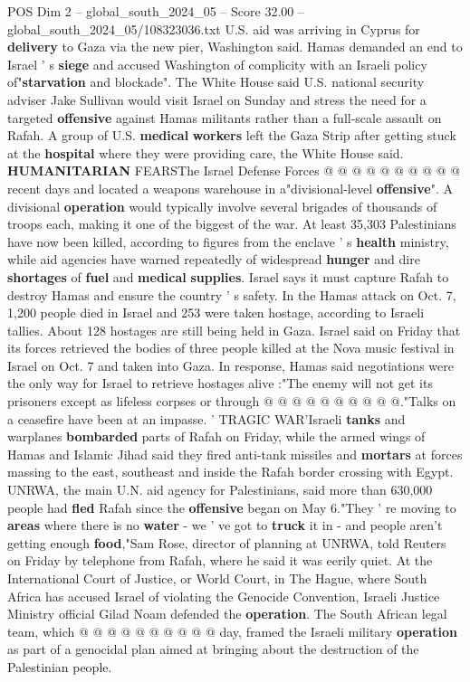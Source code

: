 \begin{textsample}{POS Dim 2 – global\_south\_2024\_05 – Score 32.00 – global\_south\_2024\_05/108323036.txt}
U.S. aid was arriving in Cyprus for \textbf{delivery} to Gaza via the new pier, Washington said.
Hamas demanded an end to Israel ' s \textbf{siege} and accused Washington of complicity with an Israeli policy of"\textbf{starvation} and blockade".
The White House said U.S. national security adviser Jake Sullivan would visit Israel on Sunday and stress the need for a targeted \textbf{offensive} against Hamas militants rather than a full-scale assault on Rafah.
A group of U.S. \textbf{medical} \textbf{workers} left the Gaza Strip after getting stuck at the \textbf{hospital} where they were providing care, the White House said. \textbf{HUMANITARIAN} FEARSThe Israel Defense Forces @ @ @ @ @ @ @ @ @ @ recent days and located a weapons warehouse in a"divisional-level \textbf{offensive}".
A divisional \textbf{operation} would typically involve several brigades of thousands of troops each, making it one of the biggest of the war.
At least 35,303 Palestinians have now been killed, according to figures from the enclave ' s \textbf{health} ministry, while aid agencies have warned repeatedly of widespread \textbf{hunger} and dire \textbf{shortages} of \textbf{fuel} and \textbf{medical} \textbf{supplies}.
Israel says it must capture Rafah to destroy Hamas and ensure the country ' s safety.
In the Hamas attack on Oct. 7, 1,200 people died in Israel and 253 were taken hostage, according to Israeli tallies.
About 128 hostages are still being held in Gaza.
Israel said on Friday that its forces retrieved the bodies of three people killed at the Nova music festival in Israel on Oct. 7 and taken into Gaza.
In response, Hamas said negotiations were the only way for Israel to retrieve hostages alive :"The enemy will not get its prisoners except as lifeless corpses or through @ @ @ @ @ @ @ @ @ @."Talks on a ceasefire have been at an impasse. ' TRAGIC WAR'Israeli \textbf{tanks} and warplanes \textbf{bombarded} parts of Rafah on Friday, while the armed wings of Hamas and Islamic Jihad said they fired anti-tank missiles and \textbf{mortars} at forces massing to the east, southeast and inside the Rafah border crossing with Egypt.
UNRWA, the main U.N. aid agency for Palestinians, said more than 630,000 people had \textbf{fled} Rafah since the \textbf{offensive} began on May 6."They ' re moving to \textbf{areas} where there is no \textbf{water} - we ' ve got to \textbf{truck} it in - and people aren't getting enough \textbf{food},"Sam Rose, director of planning at UNRWA, told Reuters on Friday by telephone from Rafah, where he said it was eerily quiet.
At the International Court of Justice, or World Court, in The Hague, where South Africa has accused Israel of violating the Genocide Convention, Israeli Justice Ministry official Gilad Noam defended the \textbf{operation}.
The South African legal team, which @ @ @ @ @ @ @ @ @ @ day, framed the Israeli military \textbf{operation} as part of a genocidal plan aimed at bringing about the destruction of the Palestinian people.


\end{textsample}
